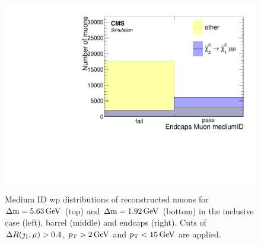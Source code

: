 \begin{figure}[!htb]
\includegraphics[width=0.32\linewidth]{plots/lepton_selection/lepton_selection_dm1p92/none_Muons_pt_endcape_medium.pdf} \\
\caption[Medium ID \gls{wp} distribution of reconstructed muons]{Medium ID \gls{wp} distributions of reconstructed muons for $\Delta\mathrm{m}=5.63\,\text{Ge\hspace{-.08em}V}$ (top) and $\Delta\mathrm{m}=1.92\,\text{Ge\hspace{-.08em}V}$ (bottom) in the inclusive \pt case (left), barrel (middle) and endcaps (right). Cuts of $\Delta R(\jmath_1,\mu)>0.4$, $p_{\mathrm{T}}>2\,\text{Ge\hspace{-.08em}V}$ and $p_{\mathrm{T}}<15\,\text{Ge\hspace{-.08em}V}$ are applied.}
\label{fig:muons-selection-id-medium}
\end{figure}

